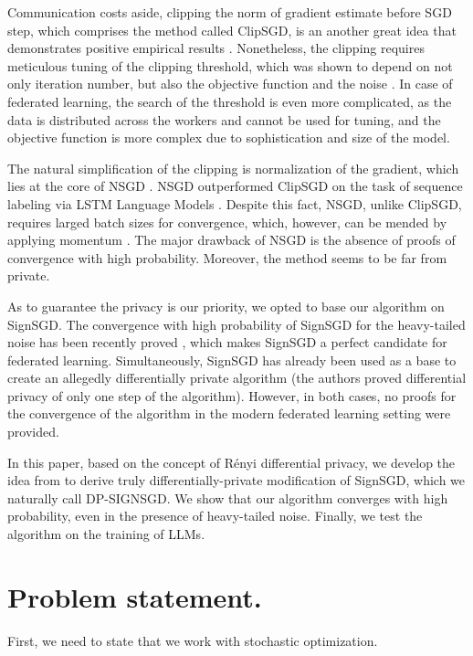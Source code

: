\documentclass[12pt]{article}
\newcommand{\algname}[1]{{\sf  #1}\xspace}
\begin{document}
Communication costs aside, clipping the norm of gradient estimate before \algname{SGD} step, which comprises the method called \algname{ClipSGD}, is an another great idea that demonstrates positive empirical results \parencite{Pascanu2013, Goodfellow2016}. Nonetheless, the clipping requires meticulous tuning of the clipping threshold, which was shown to depend on not only iteration number, but also the objective function and the noise \parencite[Theorem $3.1$]{Sadiev2023}. In case of federated learning, the search of the threshold is even more complicated, as the data is distributed across the workers and cannot be used for tuning, and the objective function is more complex due to sophistication and size of the model.

The natural simplification of the clipping is normalization of the gradient, which lies at the core of \algname{NSGD} \parencite{Hazan2015}. \algname{NSGD} outperformed \algname{ClipSGD} on the task of sequence labeling via LSTM Language Models \cite{Merity2017}. Despite this fact, \algname{NSGD}, unlike \algname{ClipSGD}, requires larged batch sizes for convergence, which, however, can be mended by applying momentum \cite{Cutkosky2020}. The major drawback of \algname{NSGD} is the absence of proofs of convergence with high probability. Moreover, the method seems to be far from private.

As to guarantee the privacy is our priority, we opted to base our algorithm on \algname{SignSGD}. The convergence with high probability of \algname{SignSGD} for the heavy-tailed noise has been recently proved \parencite{Kornilov2025}, which makes \algname{SignSGD} a perfect candidate for federated learning. Simultaneously, \algname{SignSGD} has already been used as a base to create an allegedly differentially private algorithm \parencite{Jin2020} (the authors proved differential privacy of only one step of the algorithm). However, in both cases, no proofs for the convergence of the algorithm in the modern federated learning setting were provided.

In this paper, based on the concept of Rényi differential privacy, we develop the idea from \cite{Jin2020} to derive truly differentially-private modification of \algname{SignSGD}, which we naturally call {\scriptsize DP-SIGN}SGD. We show that our algorithm converges with high probability, even in the presence of heavy-tailed noise. Finally, we test the algorithm on the training of LLMs.

\section{Problem statement.}
First, we need to state that we work with stochastic optimization.
\end{document}
